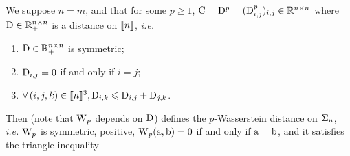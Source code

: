 
\begin{prop}\label{prop-metric-histo}
We suppose $n=m$, and that for some $p \geq 1$, $\mathrm{C}=\mathrm{D}^p=(\mathrm{D}_{i,j}^p)_{i,j} \in \mathbb{R}^{n \times n}$ where $\mathrm{D} \in \mathbb{R}_+^{n \times n}$ is a distance on $\llbracket n\rrbracket$, \emph{i.e.}
\begin{enumerate}%
	\item $\mathrm{D} \in \mathbb{R}_+^{n \times n}$ is symmetric; 
	\item $\mathrm{D}_{i,j}=0$ if and only if $i=j$; 
	\item $\forall \, (i,j,k) \in \llbracket n\rrbracket^3, \mathrm{D}_{i,k} \leqslant \mathrm{D}_{i,j}+\mathrm{D}_{j,k}$.
\end{enumerate}
Then 
(note that $\operatorname{\mathrm{W}}_p$ depends on $\mathrm{D}$) defines the $p$-Wasserstein distance on $\Sigma_n$, \emph{i.e.} $\operatorname{\mathrm{W}}_p$ is symmetric, positive, $\operatorname{\mathrm{W}}_p(\mathrm{a},\mathrm{b})=0$ if and only if $\mathrm{a} = \mathrm{b}$, and it satisfies the triangle inequality
\end{prop}

